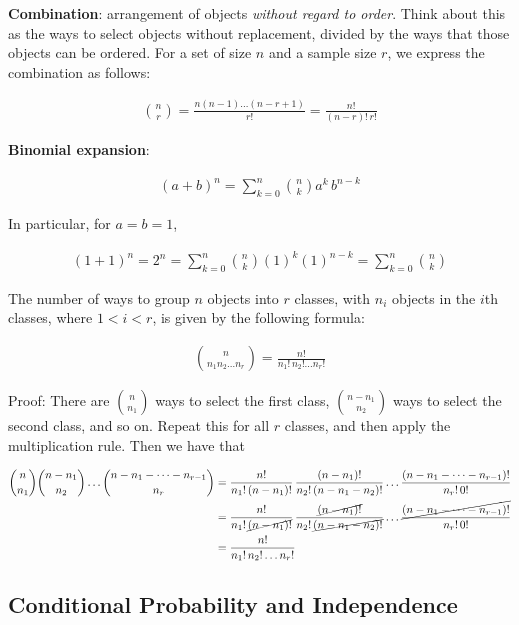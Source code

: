 \documentclass[a4paper,10pt]{article}
\begin{document}
\textbf{Combination}: arrangement of objects {\em without regard to order}. Think about this as the ways to select objects without replacement, divided by the ways that those objects can be ordered. For a set of size $n$ and a sample size $r$, we express the combination as follows:

\begin{align*}
    {n\choose r} = \frac{n(n-1)\ldots(n-r+1)}{r!} = \frac{n!}{(n-r)!\,r!}
\end{align*}

\textbf{Binomial expansion}: 

\begin{align*}
    (a+b)^n = \sum_{k=0}^n{n\choose k}a^k\,b^{n-k}
\end{align*}

In particular, for $a=b=1$, 

\begin{align*}
    (1+1)^n = 2^n = \sum_{k=0}^n{n\choose k}(1)^k(1)^{n-k} = \sum_{k=0}^n{n\choose k}
\end{align*}

The number of ways to group $n$ objects into $r$ classes, with $n_i$ objects in the $i$th classes, where $1<i<r$, is given by the following formula:

\begin{align*}
    {n\choose n_1 n_2\ldots n_r} = \frac{n!}{n_1!\,n_2!\ldots n_r!}
\end{align*}

Proof: There are $\displaystyle {n\choose n_1}$ ways to select the first class, $\displaystyle {n-n_1\choose n_2}$ ways to select the second class, and so on. Repeat this for all $r$ classes, and then apply the multiplication rule. Then we have that

\begin{align*}
    {n\choose n_1}{n-n_1\choose n_2}\ldots {n-n_1-\cdots-n_{r-1}\choose n_r} &= \frac{n!}{n_1!\,(n-n_1)!}\,\frac{(n-n_1)!}{n_2!\,(n-n_1-n_2)!}\ldots \frac{(n-n_1-\cdots-n_{r-1})!}{n_r!\,0!} \\
                                                                             &= \frac{n!}{n_1!\,\cancel{(n-n_1)!}}\,\frac{\cancel{(n-n_1)!}}{n_2!\,\cancel{(n-n_1-n_2)!}}\ldots \frac{\cancel{(n-n_1-\cdots-n_{r-1})!}}{n_r!\,0!} \\
                                                                             &= \frac{n!}{n_1!\,n_2!\ldots n_r!}
\end{align*}

\subsection{Conditional Probability and Independence}
\end{document}
